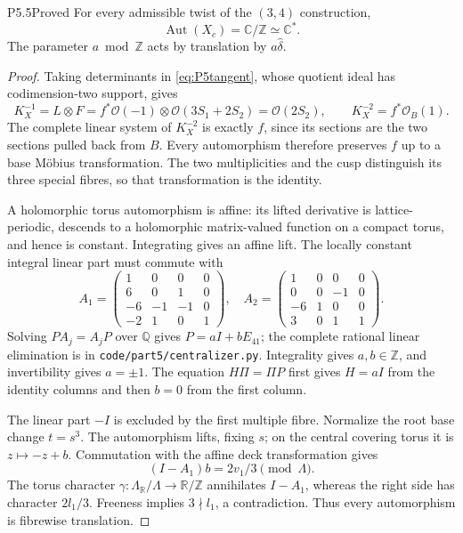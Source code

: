 \begin{statement}{P5.5}{Proved}
For every admissible twist of the $(3,4)$ construction,
\[
 \operatorname{Aut}(X_c)=\mathbb C/\mathbb Z\simeq\mathbb C^*.
\]
The parameter $a\bmod\mathbb Z$ acts by translation by $a\widehat\delta$.
\end{statement}
\begin{proof}
Taking determinants in \eqref{eq:P5tangent}, whose quotient ideal has
codimension-two support, gives
\[
 K_X^{-1}=L\otimes F
 =f^*\mathcal O(-1)\otimes\mathcal O(3S_1+2S_2)
 =\mathcal O(2S_2),\qquad K_X^{-2}=f^*\mathcal O_B(1).
\]
The complete linear system of $K_X^{-2}$ is exactly $f$, since its
sections are the two sections pulled back from $B$.  Every automorphism
therefore preserves $f$ up to a base Möbius transformation.  The two
multiplicities and the cusp distinguish its three special fibres, so
that transformation is the identity.

A holomorphic torus automorphism is affine: its lifted derivative is
lattice-periodic, descends to a holomorphic matrix-valued function on a
compact torus, and hence is constant.  Integrating gives an affine lift.
The locally constant integral linear part must commute with
\[
 A_1=\begin{pmatrix}1&0&0&0\\6&0&1&0\\-6&-1&-1&0\\-2&1&0&1\end{pmatrix},\quad
 A_2=\begin{pmatrix}1&0&0&0\\0&0&-1&0\\-6&1&0&0\\3&0&1&1\end{pmatrix}.
\]
Solving $PA_j=A_jP$ over $\mathbb Q$ gives
$P=aI+bE_{41}$; the complete rational linear elimination is in
\texttt{code/part5/centralizer.py}.  Integrality gives $a,b\in\mathbb Z$,
and invertibility gives $a=\pm1$.  The equation $H\Pi=\Pi P$ first gives
$H=aI$ from the identity columns and then $b=0$ from the first column.

The linear part $-I$ is excluded by the first multiple fibre.  Normalize
the root base change $t=s^3$.  The automorphism lifts, fixing $s$; on the
central covering torus it is $z\mapsto-z+b$.  Commutation with the affine
deck transformation gives
\[
 (I-A_1)b=2v_1/3\pmod\Lambda.
\]
The torus character $\gamma:\Lambda_{\mathbb R}/\Lambda\to\mathbb R/\mathbb Z$
annihilates $I-A_1$, whereas the right side has character $2l_1/3$.
Freeness implies $3\nmid l_1$, a contradiction.  Thus every automorphism
is fibrewise translation.


\end{proof}
